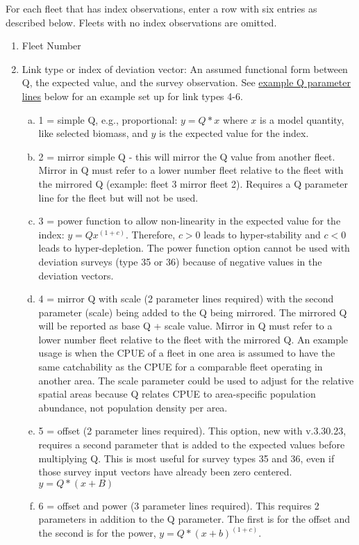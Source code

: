 For each fleet that has index observations, enter a row with six entries as described below. Fleets with no index observations are omitted.

\begin{enumerate}
	\item Fleet Number
	\item Link type or index of deviation vector: An assumed functional form between Q, the expected value, and the survey observation. See \hyperlink{QParams}{example Q parameter lines} below for an example set up for link types 4-6.
	\begin{enumerate}[(a)]
		\item 1 = simple Q, e.g., proportional: $y=Q*x$ where $x$ is a model quantity, like selected biomass, and $y$ is the expected value for the index.
		\item 2 = mirror simple Q - this will mirror the Q value from another fleet. Mirror in Q must refer to a lower number fleet relative to the fleet with the mirrored Q (example: fleet 3 mirror fleet 2). Requires a Q parameter line for the fleet but will not be used.
		\item 3 = power function to allow non-linearity in the expected value for the index: $y=Qx^{(1+c)}$. Therefore, $c > 0$ leads to hyper-stability and $c < 0$ leads to hyper-depletion. The power function option cannot be used with deviation surveys (type 35 or 36) because of negative values in the deviation vectors.
		\item 4 = mirror Q with scale (2 parameter lines required) with the second parameter (scale) being added to the Q being mirrored. The mirrored Q will be reported as base Q + scale value. Mirror in Q must refer to a lower number fleet relative to the fleet with the mirrored Q. An example usage is when the CPUE of a fleet in one area is assumed to have the same catchability as the CPUE for a comparable fleet operating in another area. The scale parameter could be used to adjust for the relative spatial areas because Q relates CPUE to area-specific population abundance, not population density per area.
		\item 5 = offset (2 parameter lines required). This option, new with v.3.30.23, requires a second parameter that is added to the expected values before multiplying Q. This is most useful for survey types 35 and 36, even if those survey input vectors have already been zero centered. $y=Q*(x+B)$
		\item 6 = offset and power (3 parameter lines required). This requires 2 parameters in addition to the Q parameter. The first is for the offset and the second is for the power, $y=Q*(x+b)^{(1+c)}$.

\end{enumerate}
\end{enumerate}
